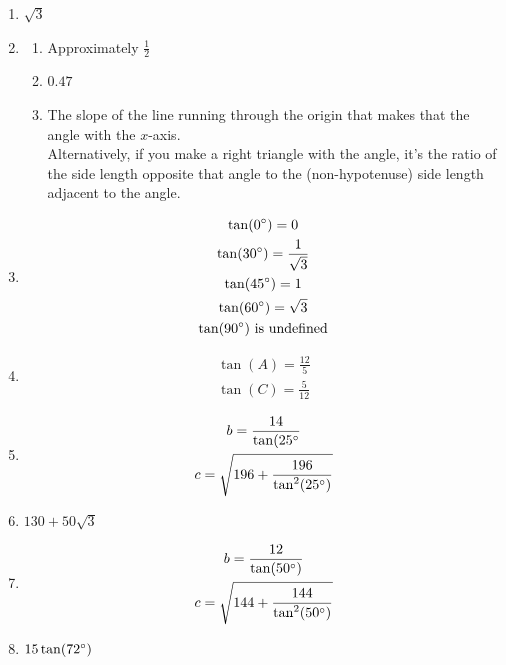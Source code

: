 \documentclass{article}
\begin{document}
\begin{enumerate}
\item $\sqrt{3}$
	
\item

	\begin{enumerate}
	
	\item Approximately $\frac{1}{2}$
	
	\item $0.47$
	
	\item The slope of the line running through the origin that makes that the angle with the $x$-axis. \\
		Alternatively, if you make a right triangle with the angle, it's the ratio of the side length opposite that angle to the (non-hypotenuse) side length adjacent to the angle.
	
	\end{enumerate}
	
\item
	\begin{gather*}
	\tan(0\degree) = 0 \\
	\tan(30\degree) = \frac{1}{\sqrt{3}} \\
	\tan(45\degree) = 1 \\
	\tan(60\degree) = \sqrt{3} \\
	\tan(90\degree) \text{ is undefined}
	\end{gather*}
	
\item
	\begin{gather*}
	\tan(A) = \frac{12}{5} \\
	\tan(C) = \frac{5}{12}
	\end{gather*}
	
\item 
	\begin{gather*}
	b = \frac{14}{\tan(25\degree} \\
	c = \sqrt{196 + \frac{196}{\tan^2(25\degree)}}
	\end{gather*}
	
\item $130 + 50\sqrt{3}$

\item
	\begin{gather*}
	b = \frac{12}{\tan(50\degree)} \\
	c = \sqrt{144 + \frac{144}{\tan^2(50\degree)}}
	\end{gather*}
	
\item $15\tan(72\degree)$


\end{enumerate}
\end{document}
